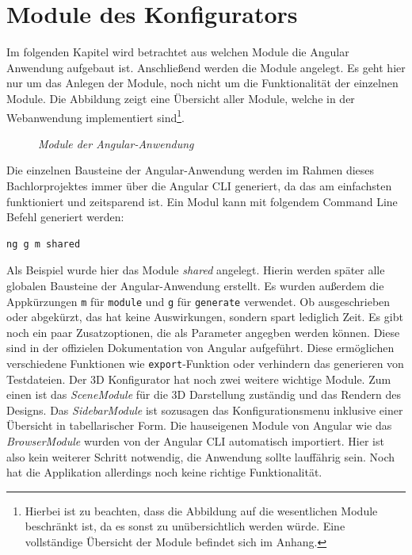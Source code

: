 \section{Module des Konfigurators}
\label{sec:umsetzung}
%
Im folgenden Kapitel wird betrachtet aus welchen Module die Angular Anwendung aufgebaut ist. Anschließend werden die Module angelegt. Es geht hier nur um das Anlegen der Module, noch nicht um die Funktionalität der einzelnen Module. Die Abbildung zeigt eine Übersicht aller Module, welche in der Webanwendung implementiert sind\footnote{Hierbei ist zu beachten, dass die Abbildung auf die wesentlichen Module beschränkt ist, da es sonst zu unübersichtlich werden würde. Eine vollständige Übersicht der Module befindet sich im Anhang.}.
\begin{figure}[h]
	\centering
	{}
	\caption[Komponentendiagramm]{\textit{Module der Angular-Anwendung}}
	\label{fig:module}
\end{figure}
Die einzelnen Bausteine der Angular-Anwendung werden im Rahmen dieses Bachlorprojektes immer über die Angular CLI generiert, da das am einfachsten funktioniert und zeitsparend ist. Ein Modul kann mit folgendem Command Line Befehl generiert werden:
%
\begin{lstlisting}
ng g m shared
\end{lstlisting}
%
Als Beispiel wurde hier das Module \textit{shared} angelegt. Hierin werden später alle globalen Bausteine der Angular-Anwendung erstellt. Es wurden außerdem die Appkürzungen \texttt{m} für \texttt{module} und \texttt{g} für \texttt{generate} verwendet. Ob ausgeschrieben oder abgekürzt, das hat keine Auswirkungen, sondern spart lediglich Zeit. Es gibt noch ein paar Zusatzoptionen, die als Parameter angegben werden können. Diese sind in der offizielen Dokumentation von Angular aufgeführt. Diese ermöglichen verschiedene Funktionen wie \texttt{export}-Funktion oder verhindern das generieren von Testdateien. Der 3D Konfigurator hat noch zwei weitere wichtige Module. Zum einen ist das \textit{SceneModule} für die 3D Darstellung zuständig und das Rendern des Designs. Das \textit{SidebarModule} ist sozusagen das Konfigurationsmenu inklusive einer Übersicht in tabellarischer Form. Die hauseigenen Module von Angular wie das \textit{BrowserModule} wurden von der Angular CLI automatisch importiert. Hier ist also kein weiterer Schritt notwendig, die Anwendung sollte lauffährig sein. Noch hat die Applikation allerdings noch keine richtige Funktionalität.
%
